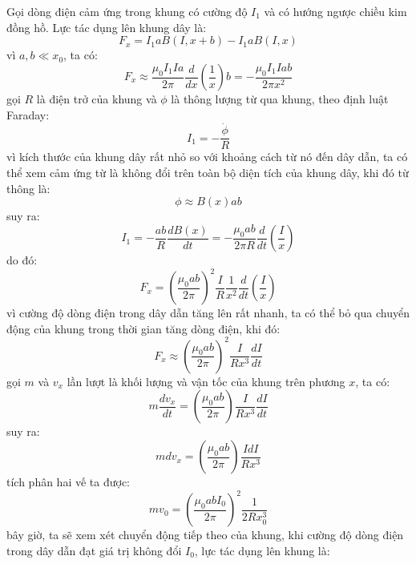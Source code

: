 \noindent Gọi dòng điện cảm ứng trong khung có cường độ $I_{1}$ và có hướng ngược chiều kim đồng hồ. Lực tác dụng lên khung dây là:
\begin{equation*}
  F_{x}=I_{1}aB(I,x+b)-I_{1}aB(I,x)
\end{equation*}
vì $a,b\ll x_{0}$, ta có:
\begin{equation*}
  F_{x}\approx\frac{\mu_{0}I_{1}Ia}{2\pi}\frac{d}{dx}\left(\frac{1}{x}\right)b=-\frac{\mu_{0}I_{1}Iab}{2\pi x^{2}}
\end{equation*}
gọi $R$ là điện trở của khung và $\phi$ là thông lượng từ qua khung, theo định luật Faraday:
\begin{equation*}
  I_{1}=-\frac{\dot{\phi}}{R}
\end{equation*}
vì kích thước của khung dây rất nhỏ so với khoảng cách từ nó đến dây dẫn, ta có thể xem cảm ứng từ là không đổi trên toàn bộ diện tích của khung dây, khi đó từ thông là:
\begin{equation*}
  \phi\approx B(x)ab
\end{equation*}
suy ra:
\begin{equation*}
  I_{1}=-\frac{ab}{R}\frac{dB(x)}{dt}=-\frac{\mu_{0}ab}{2\pi R}\frac{d}{dt}\left(\frac{I}{x}\right)
\end{equation*}
do đó:
\begin{equation*}
  F_{x}=\left(\frac{\mu_{0}ab}{2\pi}\right)^{2}\frac{I}{R}\frac{1}{x^{2}}\frac{d}{dt}\left(\frac{I}{x}\right)
\end{equation*}
vì cường độ dòng điện trong dây dẫn tăng lên rất nhanh, ta có thể bỏ qua chuyển động của khung trong thời gian tăng dòng điện, khi đó:
\begin{equation*}
  F_{x}\approx\left(\frac{\mu_{0}ab}{2\pi}\right)^{2}\frac{I}{Rx^{3}}\frac{dI}{dt}
\end{equation*}
gọi $m$ và $v_{x}$ lần lượt là khối lượng và vận tốc của khung trên phương $x$, ta có:
\begin{equation*}
  m\frac{dv_{x}}{dt}=\left(\frac{\mu_{0}ab}{2\pi}\right)\frac{I}{Rx^{3}}\frac{dI}{dt}
\end{equation*}
suy ra:
\begin{equation*}
  mdv_{x}=\left(\frac{\mu_{0}ab}{2\pi}\right)\frac{IdI}{Rx^{3}}
\end{equation*}
tích phân hai vế ta được:
\begin{equation*}
  mv_{0}=\left(\frac{\mu_{0}abI_{0}}{2\pi}\right)^{2}\frac{1}{2Rx_{0}^{3}}
\end{equation*}
bây giờ, ta sẽ xem xét chuyển động tiếp theo của khung, khi cường độ dòng điện trong dây dẫn đạt giá trị không đổi $I_{0}$, lực tác dụng lên khung là:
